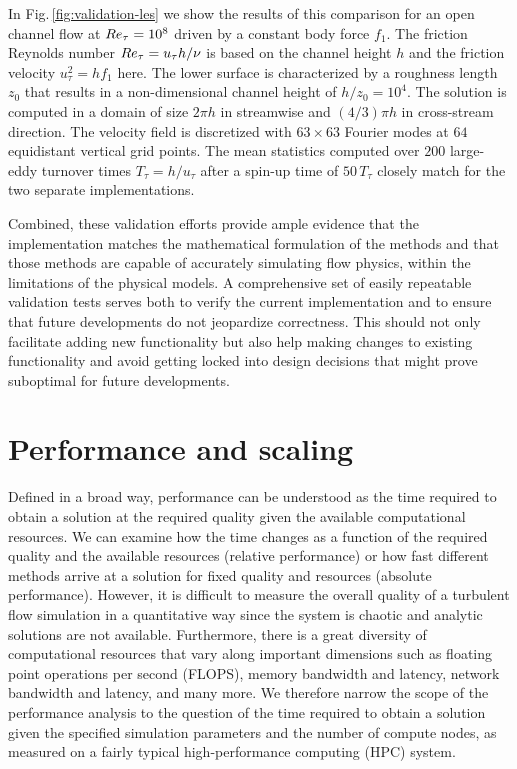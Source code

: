 \documentclass[gmd, manuscript]{copernicus}
\begin{document}
In Fig.\,\ref{fig:validation-les} we show the results of this comparison for an open channel flow at \(R \mkern -.2mue_\tau = 10^8\) driven by a constant body force \(f_1\).
The friction Reynolds number \(R \mkern -.2mue_\tau = u_\tau h/\nu\) is based on the channel height \(h\) and the friction velocity \(u_\tau^2 = h f_1\) here.
The lower surface is characterized by a roughness length \(z_0\) that results in a non-dimensional channel height of \(h/z_0 = 10^4\).
The solution is computed in a domain of size \(2 \pi h\) in streamwise and \((4/3) \pi h\) in cross-stream direction.
The velocity field is discretized with \(63 \times 63\) Fourier modes at \(64\) equidistant vertical grid points.
The mean statistics computed over \(200\) large-eddy turnover times \(T_\tau = h/u_\tau\) after a spin-up time of \(50\,T_\tau\) closely match for the two separate implementations.

Combined, these validation efforts provide ample evidence that the implementation matches the mathematical formulation of the methods and that those methods are capable of accurately simulating flow physics, within the limitations of the physical models.
A comprehensive set of easily repeatable validation tests serves both to verify the current implementation and to ensure that future developments do not jeopardize correctness.
This should not only facilitate adding new functionality but also help making changes to existing functionality and avoid getting locked into design decisions that might prove suboptimal for future developments.

\hypertarget{sec:performance}{%
\section{Performance and scaling}\label{sec:performance}}

Defined in a broad way, performance can be understood as the time required to obtain a solution at the required quality given the available computational resources.
We can examine how the time changes as a function of the required quality and the available resources (relative performance) or how fast different methods arrive at a solution for fixed quality and resources (absolute performance).
However, it is difficult to measure the overall quality of a turbulent flow simulation in a quantitative way since the system is chaotic and analytic solutions are not available.
Furthermore, there is a great diversity of computational resources that vary along important dimensions such as floating point operations per second (FLOPS), memory bandwidth and latency, network bandwidth and latency, and many more.
We therefore narrow the scope of the performance analysis to the question of the time required to obtain a solution given the specified simulation parameters and the number of compute nodes, as measured on a fairly typical high-performance computing (HPC) system.
\end{document}
